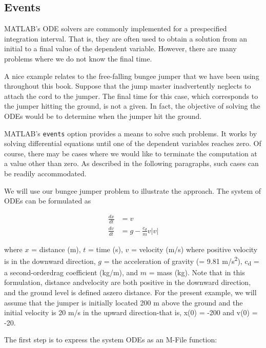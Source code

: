 \documentclass[../main.tex]{subfiles}
\begin{document}
\subsection{Events}
MATLAB's ODE solvers are commonly implemented for a prespecified integration interval. That is, they are often used to obtain a solution from an initial to a final value of the dependent variable. However, there are many problems where we do not know the final time.

A nice example relates to the free-falling bungee jumper that we have been using
throughout this book. Suppose that the jump master inadvertently neglects to attach the cord to the jumper. The final time for this case, which corresponds to the jumper hitting the ground, is not a given. In fact, the objective of solving the ODEs would be to determine when the jumper hit the ground.

MATLAB's \texttt{events} option provides a means to solve such problems. It works by
solving differential equations until one of the dependent variables reaches zero. Of course, there may be cases where we would like to terminate the computation at a value other than zero. As described in the following paragraphs, such cases can be readily accommodated.

We will use our bungee jumper problem to illustrate the approach. The system of
ODEs can be formulated as

\begin{equation}
    \begin{aligned}
    \frac{d x}{d t} &=v \\
    \frac{d v}{d t} &=g-\frac{c_{d}}{m} v|v| \nonumber
    \end{aligned}
\end{equation}


\noindent where $x$ = distance (m), $t$ = time (s), $v$ = velocity (m/s) where positive velocity is in the downward direction, $g$ = the acceleration of gravity (= 9.81 m/s\textsuperscript{2}), c\textsubscript{d} = a second-orderdrag coefficient (kg/m), and $m$ = mass (kg).
Note that in this formulation, distance andvelocity are both positive in the downward direction, and the ground level is defined aszero distance. For the present example, we will assume that the jumper is initially located 200 m above the ground and the initial velocity is 20 m/s in the upward direction-that is, x(0) = -200 and v(0) = -20.

The first step is to express the system ODEs as an M-File function:
\end{document}
